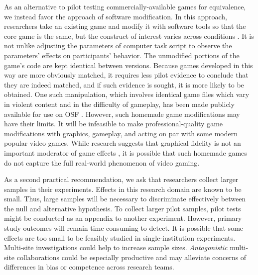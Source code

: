 \documentclass[man]{apa6}
\begin{document}
As an alternative to pilot testing commercially-available games for equivalence, we instead favor the approach of software modification. In this approach, researchers take an existing game and modify it with software tools so that the core game is the same, but the construct of interest varies across conditions \citep[see][]{Elson:Quandt:2014}. It is not unlike adjusting the parameters of computer task script to observe the parameters' effects on participants' behavior. The unmodified portions of the game's code are kept identical between versions. Because games developed in this way are more obviously matched, it requires less pilot evidence to conclude that they are indeed matched, and if such evidence is sought, it is more likely to be obtained. One such manipulation, which involves identical game files which vary in violent content and in the difficulty of gameplay, has been made publicly available for use on OSF \citep{Hilgard:2014}. However, such homemade game modifications may have their limits. It will be infeasible to make professional-quality game modifications with graphics, gameplay, and acting on par with some modern popular video games. While research suggests that graphical fidelity is not an important moderator of game effects \citep{Ivory:Kalyanaraman:2007}, it is possible that such homemade games do not capture the full real-world phenomenon of video gaming.

As a second practical recommendation, we ask that researchers collect larger samples in their experiments. Effects in this research domain are known to be small. Thus, large samples will be necessary to discriminate effectively between the null and alternative hypothesis. To collect larger pilot samples, pilot tests might be conducted as an appendix to another experiment. However, primary study outcomes will remain time-consuming to detect. It is possible that some effects are too small to be feasibly studied in single-institution experiments. Multi-site investigations could help to increase sample sizes. {\em Antagonistic} multi-site collaborations could be especially productive and may alleviate concerns of differences in bias or competence across research teams.
\end{document}
